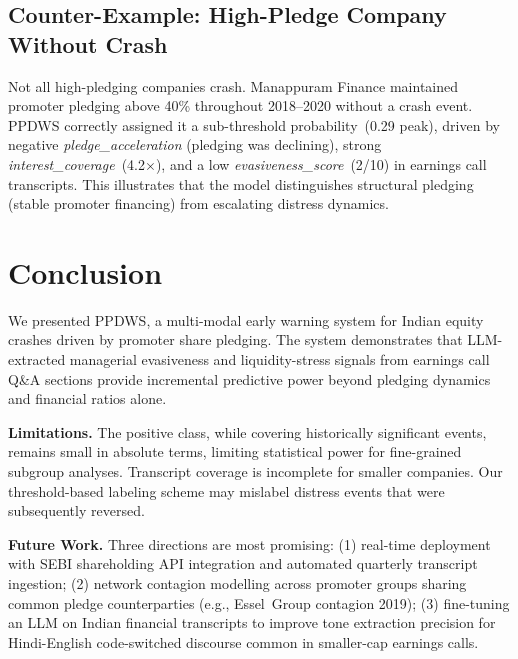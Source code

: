 \documentclass[conference]{IEEEtran}
\begin{document}
\subsection{Counter-Example: High-Pledge Company Without Crash}

Not all high-pledging companies crash. Manappuram Finance maintained
promoter pledging above 40\% throughout 2018--2020 without a crash event.
PPDWS correctly assigned it a sub-threshold probability~(0.29 peak),
driven by negative \textit{pledge\_acceleration} (pledging was declining),
strong \textit{interest\_coverage}~(4.2$\times$), and a low
\textit{evasiveness\_score}~(2/10) in earnings call transcripts. This
illustrates that the model distinguishes structural pledging (stable
promoter financing) from escalating distress dynamics.

\section{Conclusion}

We presented PPDWS, a multi-modal early warning system for Indian equity
crashes driven by promoter share pledging. The system demonstrates that
LLM-extracted managerial evasiveness and liquidity-stress signals from
earnings call Q\&A sections provide incremental predictive power beyond
pledging dynamics and financial ratios alone.

\textbf{Limitations.} The positive class, while covering historically
significant events, remains small in absolute terms, limiting
statistical power for fine-grained subgroup analyses. Transcript
coverage is incomplete for smaller companies. Our threshold-based
labeling scheme may mislabel distress events that were subsequently
reversed.

\textbf{Future Work.} Three directions are most promising: (1) real-time
deployment with SEBI shareholding API integration and automated quarterly
transcript ingestion; (2) network contagion modelling across promoter
groups sharing common pledge counterparties (e.g., Essel~Group contagion
2019); (3) fine-tuning an LLM on Indian financial transcripts to improve
tone extraction precision for Hindi-English code-switched discourse common
in smaller-cap earnings calls.



\end{document}
